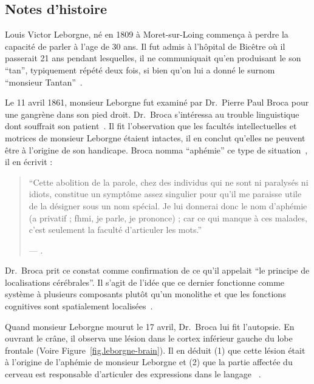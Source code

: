 \subsection{Notes d'histoire}

Louis Victor Leborgne, né en 1809 à Moret-sur-Loing commença à perdre la capacité de parler à l'age de 30 ans.
Il fut admis à l'hôpital de Bicêtre où il passerait 21 ans pendant lesquelles, 
il ne communiquait qu'en produisant le son ``tan'', typiquement répété deux fois, 
si bien qu'on lui a donné le surnom ``monsieur Tantan''~\cite{Mohammed_Narayan_Patra_Nanda_2018}.

Le 11 avril 1861, monsieur Leborgne fut examiné par Dr.~Pierre Paul Broca pour une gangrène dans son pied droit.
Dr.~Broca s'intéressa au trouble linguistique dont souffrait son patient~\cite{Lorch_2011}.
Il fit l'observation que les facultés intellectuelles et motrices de monsieur Leborgne étaient intactes,
il en conclut qu'elles ne peuvent être à l'origine de son handicape. 
Broca nomma ``aphémie'' ce type de situation~\cite{Broca}, il en écrivit :

\begin{quotation}
    ``Cette abolition de la parole, chez des individus qui ne sont ni paralysés ni idiots, constitue un symptôme assez singulier pour qu'il me paraisse utile de la désigner sous un nom spécial. Je lui donnerai donc le nom d'aphémie (\textgreek{a} privatif ; \textgreek{fhmi}, je parle, je prononce) ; car ce qui manque à ces malades, c'est seulement la faculté d'articuler les mots.''
    \begin{flushright}
        \rm --- \cite{Broca}.
    \end{flushright}
\end{quotation}

Dr.~Broca prit ce constat comme confirmation de ce qu'il appelait 
``le principe de localisations cérébrales''.
Il s'agit de l'idée que ce dernier fonctionne comme système à plusieurs composants plutôt qu'un monolithe
et que les fonctions cognitives sont spatialement localisées~\cite{Fodor_1983}.

Quand monsieur Leborgne mourut le 17 avril, Dr.~Broca lui fit l'autopsie.
En ouvrant le crâne, il observa une lésion dans le cortex inférieur gauche du lobe frontale 
(Voire Figure~\ref{fig.leborgne-brain}).
Il en déduit (1) que cette lésion était à l'origine de l'aphémie de monsieur Leborgne et 
(2) que la partie affectée du cerveau est responsable d'articuler des expressions dans le langage
~\cite{Broca,Lorch_2011,Mohammed_Narayan_Patra_Nanda_2018}.

